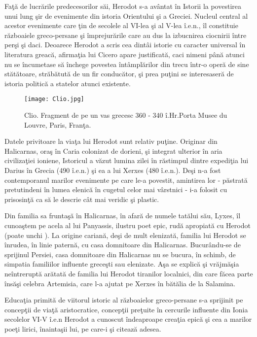 Faţă de lucrările predecesorilor săi, Herodot s-a avântat în Istorii la povestirea unui lung şir de evenimente din istoria Orientului şi a Greciei. Nucleul central al acestor evenimente care ţin de secolele al VI-lea şi al V-lea î.e.n., îl constituie războaiele greco-persane şi împrejurările care au dus la izbucnirea ciocnirii între perşi şi daci. Deoarece Herodot a scris cea dintâi istorie cu caracter universal în literatura greacă, afirmaţia lui Cicero apare justificată, caci nimeni până atunci nu se încumetase să închege povestea întâmplărilor din trecu într-o operă de sine stătătoare, străbătută de un fir conducător, şi prea puţini se interesaseră de istoria politică a statelor atunci existente.

\begin{wrapfigure}[11]{l}{0.3\linewidth} 
    \texttt{[image: Clio.jpg]}
    \caption{Clio. Fragment de pe un vas grecesc 360 - 340  î.Hr.Porta Musee du Louvre, Paris, Franţa.}
    \label{fig:pca}
\end{wrapfigure}
Datele privitoare la viaţa lui Herodot sunt relativ puţine. Originar din Halicarnas, oraş în Caria colonizat de dorieni, şi integrat ulterior în aria civilizaţiei ioniene, Istoricul a văzut lumina zilei în răstimpul dintre expediţia lui Darius în Grecia (490 î.e.n.) şi ea a lui Xerxes (480 î.e.n.). Deşi n-a fost contemporanul marilor evenimente pe care le-a povestit, amintirea lor - păstrată pretutindeni în lumea elenică în cugetul celor mai vârstnici - i-a folosit cu prisosinţă ca să le descrie cât mai veridic şi plastic.

Din familia sa fruntaşă în Halicarnas, în afară de numele tatălui său, Lyxes, îl cunoaştem pe acela al lui Panyassis, ilustru poet epic, rudă apropiată cu Herodot (poate unchi ). La origine cariană, deşi de mult elenizată, familia lui Herodot se înrudea, în linie paternă, cu casa domnitoare din Halicarnas. Bucurându-se de sprijinul Persiei, casa domnitoare din Halicarnas nu se bucura, în schimb, de simpatia familiilor influente greceşti sau elenizate. Aşa se explică şi vrăjmăşia neîntreruptă arătată de familia lui Herodot tiranilor localnici, din care făcea parte însăşi celebra Artemisia, care l-a ajutat pe Xerxes în bătălia de la Salamina.

Educaţia primită de viitorul istoric al războaielor greco-persane s-a sprijinit pe concepţii de viaţă aristocratice, concepţii preţuite în cercurile influente din Ionia secolelor VI-V î.e.n Herodot a cunoscut îndeaproape creaţia epică şi cea a marilor poeţi lirici, înaintaşii lui, pe care-i şi citează adesea.

